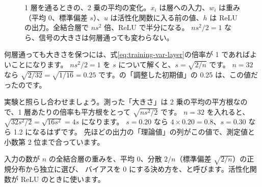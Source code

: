 \begin{figure}[tbp]
\centering
{}
\caption{1 層を通るときの、2 乗の平均の変化。$x_i$ は層への入力、$w_i$ は重み（平均 0、標準偏差 $s$）、$u$ は活性化関数に入る前の値、$h$ は ReLU の出力。全結合層で $n s^2$ 倍、ReLU で半分になる。
$n s^2/2=1$ なら、信号の大きさは何層通っても変わらない。}
\label{fig:training-variance}
\end{figure}

何層通っても大きさを保つには、式\eqref{eq:training-var-layer}の倍率が 1 であればよいことになります。
$n s^2/2=1$ を $s$ について解くと、$s=\sqrt{2/n}$ です。
$n=32$ なら $\sqrt{2/32}=\sqrt{1/16}=0.25$ です。の「調整した初期値」の 0.25 は、この値だったのです。

実験と照らし合わせましょう。測った「大きさ」は 2 乗の平均の平方根なので、1 層あたりの倍率も平方根をとって $\sqrt{n s^2/2}$ です。
$n=32$ を入れると、$\sqrt{32s^2/2}=\sqrt{16s^2}=4s$ になります。
$s=0.20$ なら $4\times0.20=0.8$、$s=0.30$ なら 1.2 になるはずです。
先ほどの出力の「理論値」の列がこの値で、測定値と小数第 2 位まで合っています。

\begin{definition}[He の初期化]
入力の数が $n$ の全結合層の重みを、平均 0、分散 $2/n$（標準偏差 $\sqrt{2/n}$）の正規分布から独立に選び、
バイアスを 0 にする決め方を、と呼びます。活性化関数が ReLU のときに使います。
\end{definition}

